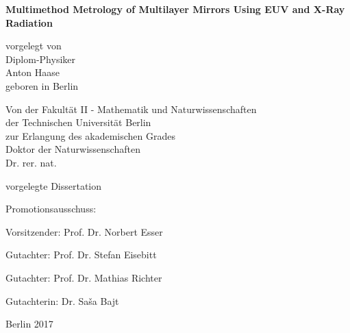 
\begin{titlepage}
{\noindent\sffamily\large%
    \begin{center}
        \vspace*{3ex}
        
        {\LARGE\bfseries\sffamily
           Multimethod Metrology of Multilayer Mirrors Using EUV and X-Ray Radiation
        }
        \vspace{1cm}

        vorgelegt von \\
        Diplom-Physiker \\
        Anton Haase \\
        geboren in Berlin \\
        \vspace{4cm}

        Von der Fakultät II - Mathematik und Naturwissenschaften \\
        der Technischen Universität Berlin \\
        zur Erlangung des akademischen Grades \\
        Doktor der Naturwissenschaften \\
        Dr. rer. nat. \\
        \vspace{3ex}

        vorgelegte Dissertation \\
        \vspace{2cm}
    \end{center}

    Promotionsausschuss:
    \vspace{2ex}

    Vorsitzender: Prof. Dr. Norbert Esser

    Gutachter: Prof. Dr. Stefan Eisebitt

    Gutachter: Prof. Dr. Mathias Richter

    Gutachterin: Dr. Sa\v{s}a Bajt
    \vspace{1ex}


    \vfill
    \begin{center}
        Berlin 2017
    \end{center}
}
\end{titlepage}

\cleardoublepage

